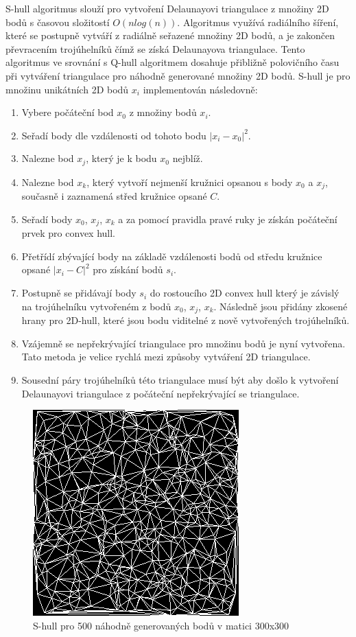 \documentclass[czech,bachelor,dept460,male,csharp,cpdeclaration]{diploma}
\begin{document}
	S-hull algoritmus slouží pro vytvoření Delaunayovi triangulace z množiny 2D bodů s časovou složitostí $O(n  log(n))$. Algoritmus využívá radiálního šíření, které se postupně vytváří z radiálně seřazené množiny 2D bodů, a je zakončen převracením trojúhelníků čímž se získá Delaunayova triangulace. Tento algoritmus ve srovnání s Q-hull algoritmem dosahuje přibližně polovičního času při vytváření triangulace pro náhodně generované množiny 2D bodů. S-hull je pro množinu unikátních 2D bodů $x_i$ implementován následovně:
	\begin{enumerate}
		\item Vybere počáteční bod $x_0$ z množiny bodů $x_i$.
		\item Seřadí body dle vzdálenosti od tohoto bodu $|x_i - x_0|^2$.
		\item Nalezne bod $x_j$, který je k bodu $x_0$ nejblíž.
		\item Nalezne bod $x_k$, který vytvoří nejmenší kružnici opsanou s body $x_0$ a $x_j$, současně i zaznamená střed kružnice opsané $C$.
		\item Seřadí body $x_0$, $x_j$, $x_k$ a za pomocí pravidla pravé ruky \cite{rhs} je získán počáteční prvek pro convex hull.
		\item Přetřídí zbývající body na základě vzdálenosti bodů od středu kružnice opsané $|x_i - C|^2$ pro získání bodů $s_i$.
		\item Postupně se přidávají body $s_i$ do rostoucího 2D convex hull který je závislý na trojúhelníku vytvořeném z bodů $x_0$, $x_j$, $x_k$. Následně jsou přidány zkosené hrany pro 2D-hull, které jsou bodu viditelné z nově vytvořených trojúhelníků.
		\item Vzájemně se nepřekrývající triangulace pro množinu bodů je nyní vytvořena. Tato metoda je velice rychlá mezi způsoby vytváření 2D triangulace.
		\item Sousední páry trojúhelníků této triangulace musí být  aby došlo k vytvoření Delaunayovi triangulace z počáteční nepřekrývající se triangulace.
	\end{enumerate}
	
	\begin{figure}[h]
		\centering
		\includegraphics{Data/bmp_triangulace.png}
		\caption{S-hull pro 500 náhodně generovaných bodů v matici 300x300}
	\end{figure}
	
\end{document}
